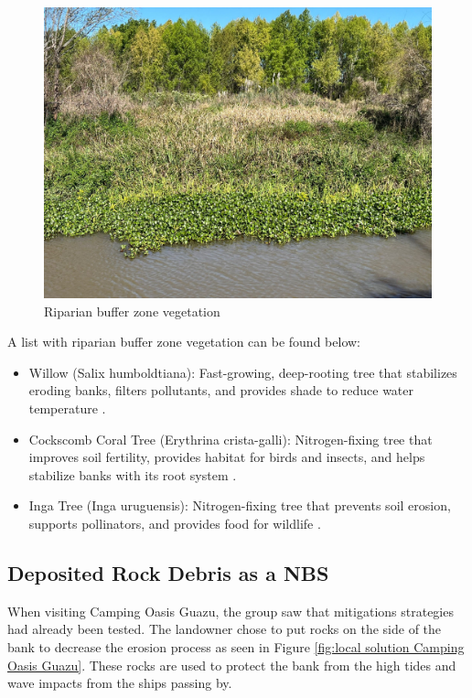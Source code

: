 \begin{figure}[H]
    \centering
    \includegraphics[width=0.5\linewidth]{figures/ch8/riparian.jpg}
    \caption{Riparian buffer zone vegetation}
    \label{fig:riparian zone}
\end{figure}

A list with riparian buffer zone vegetation can be found below:

\begin{itemize}
    \item Willow (Salix humboldtiana): Fast-growing, deep-rooting tree that stabilizes eroding banks, filters pollutants, and provides shade to reduce water temperature \autocite{SalixHumboldtiana}.
    \item Cockscomb Coral Tree (Erythrina crista-galli): Nitrogen-fixing tree that improves soil fertility, provides habitat for birds and insects, and helps stabilize banks with its root system \autocite{CockspurCoralTree}.
    \item Inga Tree (Inga uruguensis): Nitrogen-fixing tree that prevents soil erosion, supports pollinators, and provides food for wildlife \autocite{plantasnativasIngaUraguensisInga2008}.
\end{itemize}


\subsection{Deposited Rock Debris as a NBS}
When visiting Camping Oasis Guazu, the group saw that mitigations strategies had already been tested. The landowner chose to put rocks on the side of the bank to decrease the erosion process as seen in Figure \ref{fig:local solution Camping Oasis Guazu}. These rocks are used to protect the bank from the high tides and wave impacts from the ships passing by.

